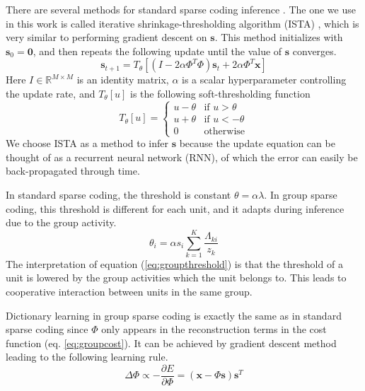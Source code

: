 There are several methods for standard sparse coding inference \cite{lh06, rc08, ba09}. The one we use in this work is called iterative shrinkage-thresholding algorithm (ISTA) \cite{di04, ba09}, which is very similar to performing gradient descent on $\boldsymbol{s}$. This method initializes with $\boldsymbol{s}_0 = \boldsymbol{0}$, and then repeats the following update until the value of $\boldsymbol{s}$ converges.
\begin{equation}
\boldsymbol{s}_{t+1} = T_{\theta}\left[
	\left(I - 2\alpha \Phi^T\Phi\right) \boldsymbol{s}_t + 2\alpha \Phi^T \boldsymbol{x}
\right]
\end{equation}
Here $I \in \mathbb{R}^{M \times M}$ is an identity matrix, $\alpha$ is a scalar hyperparameter controlling the update rate, and $T_{\theta}[u]$ is the following soft-thresholding function
\begin{equation}
T_{\theta}[u] = \begin{cases}
	u - \theta &\text{if $u > \theta$}\\
	u + \theta &\text{if $u < -\theta$}\\
	0 &\text{otherwise}
\end{cases}
\label{eq:thresh_fn}
\end{equation}
We choose ISTA as a method to infer $\boldsymbol{s}$ because the update equation can be thought of as a recurrent neural network (RNN), of which the error can easily be back-propagated through time.

In standard sparse coding, the threshold is constant $\theta = \alpha\lambda$. In group sparse coding, this threshold is different for each unit, and it adapts during inference due to the group activity.
\begin{equation}
\label{eq:groupthreshold}
\theta_i =
	\alpha s_i \sum_{k=1}^K \frac{\Lambda_{ki}}{z_k}
\end{equation}
The interpretation of equation (\ref{eq:groupthreshold}) is that the threshold of a unit is lowered by the group activities which the unit belongs to. This leads to cooperative interaction between units in the same group.

Dictionary learning in group sparse coding is exactly the same as in standard sparse coding since $\Phi$ only appears in the reconstruction terms in the cost function (eq. \ref{eq:groupcost}). It can be achieved by gradient descent method leading to the following learning rule.
\begin{equation}
\label{eq:grad_phi}
\Delta\Phi \propto -\frac{\partial{E}}{\partial{\Phi}}
           = (\boldsymbol{x} - \Phi\boldsymbol{s})\boldsymbol{s}^T
\end{equation}

